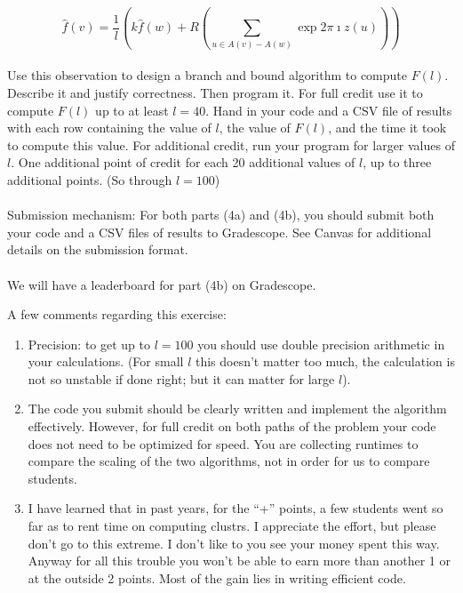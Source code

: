 \documentclass{article}
\begin{document}
\begin{enumerate}[label= (\alph*)]
            \[\hat{f}(v) = \frac{1}{l} (k \hat{f}(w) + R(\sum_{u\in A(v) - A(w)} \exp{2 \pi \imath
                        z(u)}))\]

            \paragraph{}
            Use this observation to design a branch and bound algorithm to compute \(F(l)\). Describe
            it and justify correctness. Then program it. For full credit use it to compute \(F(l)\) up
            to at least \(l=40\). Hand in your code and a CSV file of results with each row containing
            the value of \(l\), the value of \(F(l)\), and the time it took to compute this value. For
            additional credit, run your program for larger values of \(l\). One additional point of
            credit for each 20 additional values of \(l\), up to three additional points. (So through
            \(l=100\))
            \paragraph{}
            Submission mechanism: For both parts (4a) and (4b), you should submit both your code and a
            CSV files of results to Gradescope. See Canvas for additional details on the submission
            format.
            \paragraph{}
            We will have a leaderboard for part (4b) on Gradescope.
\end{enumerate}
A few comments regarding this exercise:
\begin{enumerate}[label= (\alph*)]
      \item Precision: to get up to \(l=100\) you should use double precision arithmetic
            in your calculations. (For small \(l\) this doesn't matter too much, the calculation
            is not so unstable if done right; but it can matter for large \(l\)).
      \item The code you submit should be clearly written and implement the algorithm
            effectively. However, for full credit on both paths of the problem your code does
            not need to be optimized for speed. You are collecting runtimes to compare the
            scaling of the two algorithms, not in order for us to compare students.
      \item I have learned that in past years, for the ``+'' points, a few students went so
            far as to rent time on computing clustrs. I appreciate the effort, but please don't
            go to this extreme. I don't like to you see your money spent this way. Anyway for
            all this trouble you won't be able to earn more than another 1 or at the outside 2
            points. Most of the gain lies in writing efficient code.
\end{enumerate}
\end{document}

